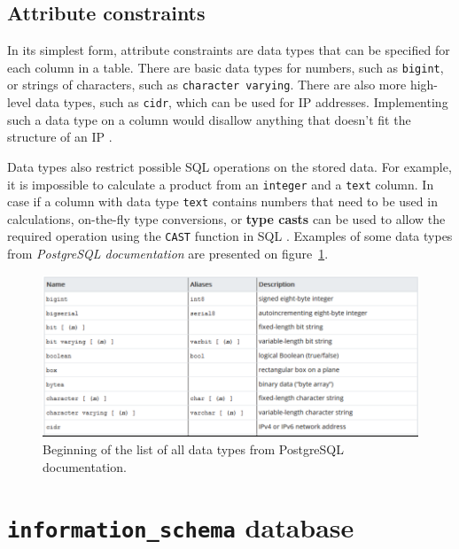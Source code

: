 \documentclass[11pt]{article}
\begin{document}
    \subsection{Attribute constraints} \label{subsec:att_constr}

    In its simplest form, attribute constraints are data types that can be specified for each column in a table.
    There are basic data types for numbers, such as \texttt{bigint}, or strings of characters, such as \texttt{character varying}.
    There are also more high-level data types, such as \texttt{cidr}, which can be used for IP addresses.
    Implementing such a data type on a column would disallow anything that doesn't fit the structure of an IP .

    Data types also restrict possible SQL operations on the stored data.
    For example, it is impossible to calculate a product from an \texttt{integer} and a \texttt{text} column.
    In case if a column with data type \texttt{text} contains numbers that need to be used in calculations, on-the-fly type conversions, or \textbf{type casts} can be used to allow the required operation using the \texttt{CAST} function in SQL .
    Examples of some data types from \textit{PostgreSQL documentation}\cite{ThePostgreSQLGlobalDevelopmentGroup2019} are presented on figure~\ref{fig:dtypes}.

    \begin{figure}[hbt!]
        \centering
        \includegraphics[width=1\linewidth,trim=1 1 1 1,clip]{img/dtypes.png}
        \caption{Beginning of the list of all data types from PostgreSQL documentation\cite{ThePostgreSQLGlobalDevelopmentGroup2019}.}
        \label{fig:dtypes}
    \end{figure}


    \section{\texttt{information\_schema} database} \label{sec:info_schema}
\end{document}
